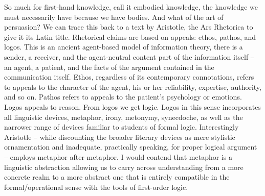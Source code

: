 \documentclass[dah,phd,a4paper]{xe_uccthesis}
\begin{document}
So much for first-hand knowledge, call it embodied knowledge, the knowledge we must necessarily have because we have bodies. And what of the art of persuasion? We can trace this back to a text by Aristotle, the Ars Rhetorica to give it its Latin title. Rhetorical claims are based on appeals: ethos, pathos, and logos. This is an ancient agent-based model of information theory, there is a sender, a receiver, and the agent-neutral content part of the information itself – an agent, a patient, and the facts of the argument contained in the communication itself. Ethos, regardless of its contemporary connotations, refers to appeals to the character of the agent, his or her reliability, expertise, authority, and so on. Pathos refers to appeals to the patient's psychology or emotions. Logos appeals to reason. From logos we get logic. Logos in this sense incorporates all linguistic devices, metaphor, irony, metonymy, synecdoche, as well as the narrower range of devices familiar to students of formal logic. Interestingly Aristotle – while discounting the broader literary devices as mere stylistic ornamentation and inadequate, practically speaking, for proper logical argument – employs metaphor after metaphor. I would contend that metaphor is a linguistic abstraction allowing us to carry across understanding from a more concrete realm to a more abstract one that is entirely compatible in the formal/operational sense with the tools of first-order logic.
\end{document}

